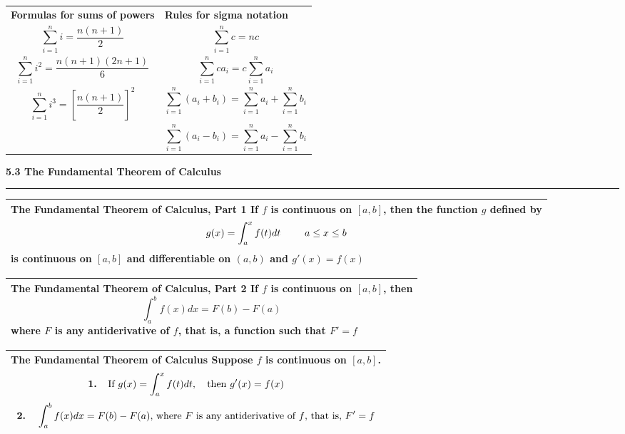 \documentclass[fleqn]{article}
\begin{document}
\begin{center}
\def\arraystretch{.1}
{\setlength{\tabcolsep}{16pt}
\begin{tabularx}{.9\textwidth}{|X X|}
\hline
	\vspace{14pt} \textbf{Formulas for sums of powers} & \vspace{14pt} \textbf{Rules for sigma notation}\\[10pt]
	\[ \sum_{i=1}^n i = \dfrac{n(n+1)}{2} \] & \[ \sum_{i=1}^n c = nc \] \\	
	\[ \sum_{i=1}^n i^2 = \dfrac{n(n+1)(2n+1)}{6} \] & \[ \sum_{i=1}^n ca_i = c \sum_{i=1}^n a_i \] \\
	\[ \sum_{i=1}^n i^3 = \left[ \dfrac{n(n+1)}{2} \right]^2 \] & \[ \sum_{i=1}^n (a_i + b_i) = \sum_{i=1}^n a_i + \sum_{i=1}^n b_i \] \\
	& \[ \sum_{i=1}^n (a_i - b_i) = \sum_{i=1}^n a_i - \sum_{i=1}^n b_i \] \\[5pt]
\hline
\end{tabularx}}
\vspace{12pt}

\vspace{32pt}
\Large\textbf{5.3 The Fundamental Theorem of Calculus}

\noindent\hfill\rule{0.3\textwidth}{.4pt}\hfill
\vspace{12pt}

\large
\def\arraystretch{1.3}
{\setlength{\tabcolsep}{16pt}
\begin{tabularx}{.9\textwidth}{|X|}
\hline
	\textbf{The Fundamental Theorem of Calculus, Part 1} \:\: If $f$ is continuous on $[a,b]$, then the function $g$ defined by 
	$$ g(x) = \int_a^x f(t) dt \text{\hspace{24pt}} a \leq x \leq b$$
	is continuous on $[a,b]$ and differentiable on $(a,b)$ and $g'(x) = f(x)$\\
\hline
\end{tabularx}}
\vspace{12pt}

\def\arraystretch{1.3}
{\setlength{\tabcolsep}{16pt}
\begin{tabularx}{.9\textwidth}{|X|}
\hline
	\textbf{The Fundamental Theorem of Calculus, Part 2} \:\: If $f$ is continuous on $[a,b]$, then 
	$$\int_a^b f(x) dx = F(b) - F(a)$$
	where $F$ is any antiderivative of $f$, that is, a function such that $F' = f$\\
\hline
\end{tabularx}}
\vspace{12pt}

\def\arraystretch{1.3}
{\setlength{\tabcolsep}{16pt}
\begin{tabularx}{.9\textwidth}{|X|}
\hline
	\textbf{The Fundamental Theorem of Calculus} \:\: Suppose $f$ is continuous on $[a,b]$.	
	\[\text{\hspace{-20pt}\textbf{1.} \: If }g(x) = \int_a^x f(t) dt \text{, \hspace{5pt} then }g'(x) = f(x)\]
	\[\text{\textbf{2.} \: }\int_a^b f(x) dx = F(b) - F(a)\text{, where $F$ is any antiderivative of $f$, that is, $F' = f$}\]\\
\hline
\end{tabularx}}
\vspace{12pt}
\pagebreak


\end{center}
\end{document}
